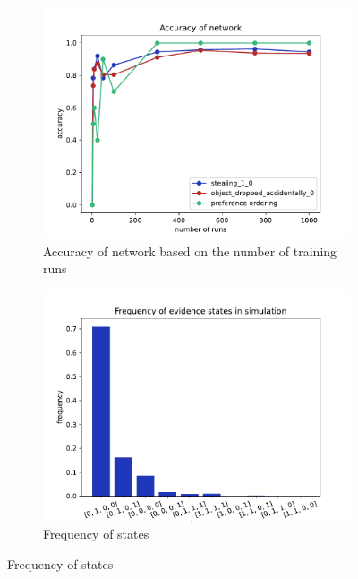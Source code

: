 \documentclass[11pt]{article}
\begin{document}
\begin{figure}[htbp]
\begin{center}
\begin{subfigure}{0.6\textwidth}
\includegraphics[width=\linewidth]{../experiments/GroteMarktPrivate/plots/accuracy.pdf}
\caption{Accuracy of network based on the number of training runs}
\label{girl}
\end{subfigure}%
\begin{subfigure}{0.6\textwidth}
\includegraphics[width=\linewidth]{../experiments/GroteMarktPrivate/plots/freqStates.pdf}
\caption{Frequency of states}
\label{fifteen}
\end{subfigure}
\end{center}
\end{figure}
\end{document}
